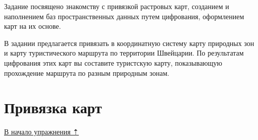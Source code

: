 \documentclass[]{book}
\theoremstyle{definition}
\theoremstyle{definition}
\theoremstyle{definition}
\theoremstyle{remark}
\begin{document}
Задание посвящено знакомству с привязкой растровых карт, созданием и
наполнением баз пространственных данных путем цифрования, оформлением
карт на их основе.

В задании предлагается привязать в координатную систему карту природных
зон и карту туристического маршрута по территории Швейцарии. По
результатам цифрования этих карт вы составите туристскую карту,
показывающую прохождение маршрута по разным природным зонам.

\hypertarget{map-ref-general-referencing}{%
\section{Привязка карт}\label{map-ref-general-referencing}}

\protect\hyperlink{map-ref-general}{В начало упражнения ⇡}
\end{document}
